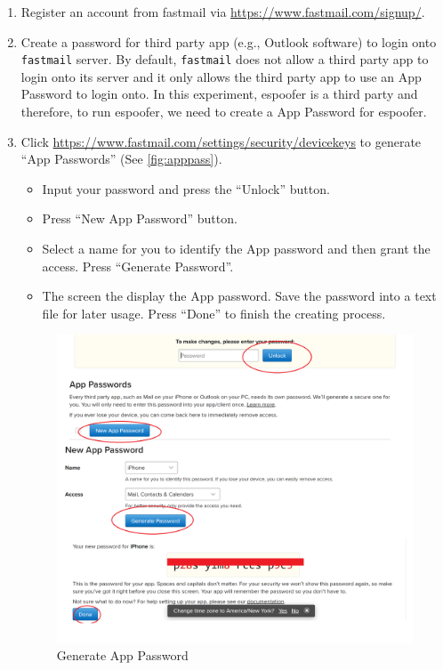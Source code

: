 \documentclass[11pt]{article}
\newcommand{\espoofer}{{\sf espoofer}\xspace}
\begin{document}
\begin{enumerate}
\item Register an account from fastmail via \url{https://www.fastmail.com/signup/}. 
\item Create a password for third party app (e.g., Outlook software) to login onto \texttt{fastmail} server. By default, \texttt{fastmail} does not allow a third party app to login onto its server and it only allows the third party app to use an App Password to login onto. In this experiment, \espoofer is a third party and therefore, to run \espoofer, we need to create a App Password for \espoofer. 
\item Click \url{https://www.fastmail.com/settings/security/devicekeys} to generate ``App Passwords'' (See \autoref{fig:apppass}). 
\begin{itemize}
\item Input your password and press the ``Unlock'' button.   
\item Press ``New App Password'' button.
\item Select a name for you to identify the App password and then grant the access. Press ``Generate Password''.
\item 	The screen the display the App password. Save the password into a text file for later usage. Press ``Done'' to finish the creating process.
\end{itemize}


\begin{figure}[h]
\centering
\vspace{-2mm}
\includegraphics[width=0.8\columnwidth]{apppass}
\caption{Generate App Password}\label{fig:apppass}
\end{figure}


\end{enumerate}
\end{document}
